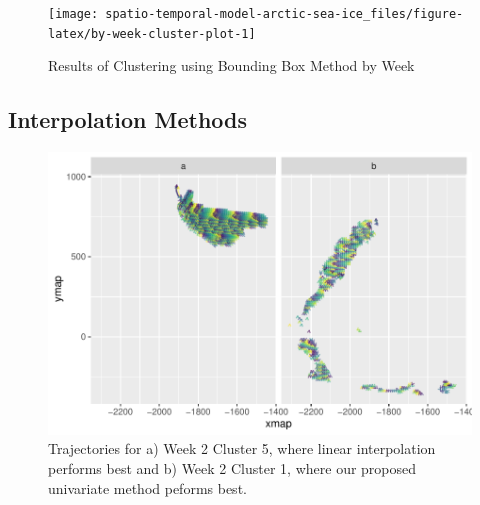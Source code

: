\documentclass[12pt]{article}
\begin{document}
\begin{figure}[tbp]

{\centering \texttt{[image: spatio-temporal-model-arctic-sea-ice\_files/figure-latex/by-week-cluster-plot-1]} 

}

\caption{Results of Clustering using Bounding Box Method by Week}\label{fig:by-week-cluster-plot}
\end{figure}

\hypertarget{interpolation-methods}{%
\subsection{Interpolation Methods}\label{interpolation-methods}}

\begin{figure}[tbp]

{\centering \includegraphics[width=\linewidth,]{spatio-temporal-model-arctic-sea-ice_files/figure-latex/int-best-plots-1} 

}

\caption{Trajectories for a) Week 2 Cluster 5, where linear interpolation performs best and b) Week 2 Cluster 1, where our proposed univariate method peforms best.}\label{fig:int-best-plots}
\end{figure}
\end{document}
